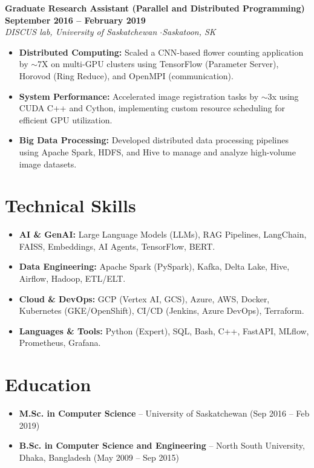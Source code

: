 \documentclass[10pt,letterpaper]{article}
\begin{document}
\vspace{4pt}

\noindent
\textbf{\large Graduate Research Assistant (Parallel and Distributed Programming)} \hfill \textbf{September 2016 -- February 2019} \\
\textit{\color{primary} DISCUS lab, University of Saskatchewan \quad$\cdot$\quad Saskatoon, SK}
\begin{itemize}
    \item \textbf{Distributed Computing:} Scaled a CNN-based flower counting application by $\sim$7X on multi-GPU clusters using TensorFlow (Parameter Server), Horovod (Ring Reduce), and OpenMPI (communication).
    \item \textbf{System Performance:} Accelerated image registration tasks by $\sim$3x using CUDA C++ and Cython, implementing custom resource scheduling for efficient GPU utilization.
    \item \textbf{Big Data Processing:} Developed distributed data processing pipelines using Apache Spark, HDFS, and Hive to manage and analyze high-volume image datasets.
\end{itemize}

\section{Technical Skills}
\begin{itemize}[label={}, leftmargin=0pt]
    \item \textbf{AI \& GenAI:} Large Language Models (LLMs), RAG Pipelines, LangChain, FAISS, Embeddings, AI Agents, TensorFlow, BERT.
    \item \textbf{Data Engineering:} Apache Spark (PySpark), Kafka, Delta Lake, Hive, Airflow, Hadoop, ETL/ELT.
    \item \textbf{Cloud \& DevOps:} GCP (Vertex AI, GCS), Azure, AWS, Docker, Kubernetes (GKE/OpenShift), CI/CD (Jenkins, Azure DevOps), Terraform.
    \item \textbf{Languages \& Tools:} Python (Expert), SQL, Bash, C++, FastAPI, MLflow, Prometheus, Grafana.
\end{itemize}

\section{Education}
\begin{itemize}
    \item \textbf{M.Sc. in Computer Science} -- University of Saskatchewan \hfill (Sep 2016 -- Feb 2019)
    \item \textbf{B.Sc. in Computer Science and Engineering} -- North South University, Dhaka, Bangladesh \hfill (May 2009 -- Sep 2015)
\end{itemize}
\end{document}
